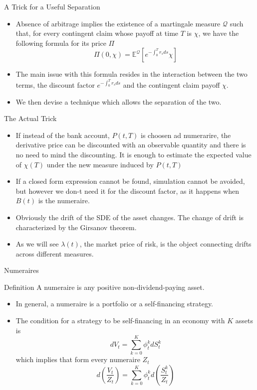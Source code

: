 \documentclass{beamer}
\begin{document}
\begin{frame}{A Trick for a Useful Separation}
\begin{itemize}
	\item Absence of arbitrage implies the existence of a martingale measure $\mathcal{Q}$ such that, for every contingent claim whose payoff at time $T$ is $\chi$, we have the following formula for its price $\Pi$
	\begin{equation}
	\Pi(0,\chi)=\mathbb{E}^{\mathcal{Q}}\left[e^{-\int_0^T r_s ds}\chi\right]
	\end{equation}
	\item The main issue with this formula resides in the interaction between the two terms, the discount factor $e^{-\int_0^Tr_sds}$ and the contingent claim payoff $\chi$.
	\item We then devise a technique which allows the separation of the two.
\end{itemize}
\end{frame}

\begin{frame}{The Actual Trick}
\begin{itemize}
	\item If instead of the bank account, $P(t,T)$ is choosen ad numerarire, the derivative price can be discounted with an observable quantity and there is no need to mind the discounting. It is enough to estimate the expected value of $\chi(T)$ under the new measure induced by $P(t,T)$	
	\item If a closed form expression cannot be found, simulation cannot be avoided, but however we don-t need it for the discount factor, as it happens when $B(t)$ is the numeraire.
	\item Obviously the drift of the SDE of the asset changes. The change of drift is characterized by the Girsanov theorem.
	\item As we will see $\lambda(t)$, the market price of risk, is the object connecting drifts across different measures.
\end{itemize}
\end{frame}

\begin{frame}{Numeraires}
	\begin{block}{Definition}
		A numeraire is any positive non-dividend-paying asset.
	\end{block}
	\begin{itemize}
		\item In general, a numeraire is a portfolio or a self-financing strategy.
		\item The condition for a strategy to be self-financing in an economy with $K$ assets is
		\begin{equation}
			dV_t = \sum_{k=0}^K \phi^k_t dS^k_t
		\end{equation}
		which implies that form every numeraire $Z_t$
		\begin{equation}
			d\left(\frac{V_t}{Z_t}\right) = \sum_{k=0}^K \phi^k_t d\left(\frac{S^k_t}{Z_t}\right)
		\end{equation}
	\end{itemize}
\end{frame}
\end{document}
